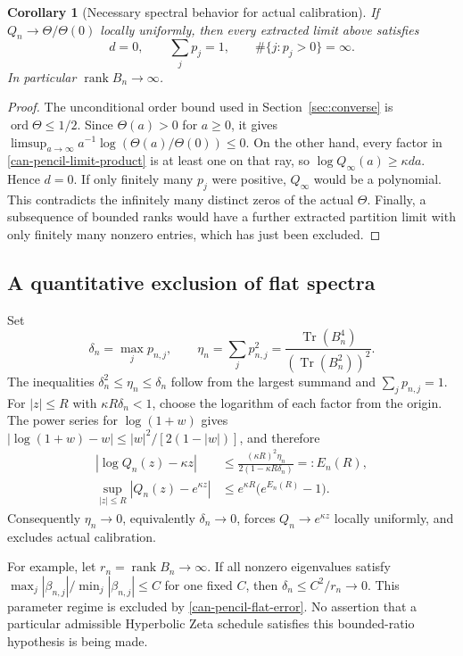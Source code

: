 \documentclass[11pt,a4paper]{article}
\numberwithin{equation}{section}
\newtheorem{corollary}[theorem]{Corollary}
\theoremstyle{definition}
\theoremstyle{remark}
\DeclareMathOperator{\Tr}{Tr}
\begin{document}
\begin{corollary}[Necessary spectral behavior for actual calibration]
\label{can-pencil-actual-restrictions}
If $Q_n\to\Theta/\Theta(0)$ locally uniformly, then every extracted
limit above satisfies
\begin{equation}\label{can-pencil-no-lost-mass}
d=0,\qquad \sum_jp_j=1,\qquad
\#\{j:p_j>0\}=\infty.
\end{equation}
In particular $\operatorname{rank}B_n\to\infty$.
\end{corollary}
\begin{proof}
The unconditional order bound used in Section~\ref{sec:converse}
is $\operatorname{ord}\Theta\leq1/2$. Since $\Theta(a)>0$ for
$a\geq0$, it gives
$\limsup_{a\to\infty}a^{-1}\log(\Theta(a)/\Theta(0))\leq0$.
On the other hand, every factor in
\eqref{can-pencil-limit-product} is at least one on that ray, so
$\log Q_\infty(a)\geq\kappa d a$. Hence $d=0$.
If only finitely many $p_j$ were positive, $Q_\infty$ would be a
polynomial. This contradicts the infinitely many distinct zeros of
the actual $\Theta$. Finally, a subsequence of bounded ranks would
have a further extracted partition limit with only finitely many
nonzero entries, which has just been excluded.
\end{proof}

\subsection*{A quantitative exclusion of flat spectra}

Set
\[
\delta_n=\max_jp_{n,j},\qquad
\eta_n=\sum_jp_{n,j}^2
=\frac{\Tr(B_n^4)}{(\Tr(B_n^2))^2}.
\]
The inequalities $\delta_n^2\leq\eta_n\leq\delta_n$ follow from
the largest summand and $\sum_jp_{n,j}=1$. For $|z|\leq R$ with
$\kappa R\delta_n<1$, choose the logarithm of each factor from
the origin. The power series for $\log(1+w)$ gives
$|\log(1+w)-w|\leq |w|^2/[2(1-|w|)]$, and therefore
\begin{align}
|\log Q_n(z)-\kappa z|
&\leq \frac{(\kappa R)^2\eta_n}{2(1-\kappa R\delta_n)}
=:E_n(R),\label{can-pencil-flat-log}\\
\sup_{|z|\leq R}|Q_n(z)-e^{\kappa z}|
&\leq e^{\kappa R}\bigl(e^{E_n(R)}-1\bigr).
\label{can-pencil-flat-error}
\end{align}
Consequently $\eta_n\to0$, equivalently $\delta_n\to0$, forces
$Q_n\to e^{\kappa z}$ locally uniformly, and excludes actual
calibration.

For example, let $r_n=\operatorname{rank}B_n\to\infty$. If all
nonzero eigenvalues satisfy
$\max_j|\beta_{n,j}|/\min_j|\beta_{n,j}|\leq C$ for one fixed
$C$, then $\delta_n\leq C^2/r_n\to0$. This parameter regime is
excluded by \eqref{can-pencil-flat-error}. No assertion that a
particular admissible Hyperbolic Zeta schedule satisfies this
bounded-ratio hypothesis is being made.
\end{document}
